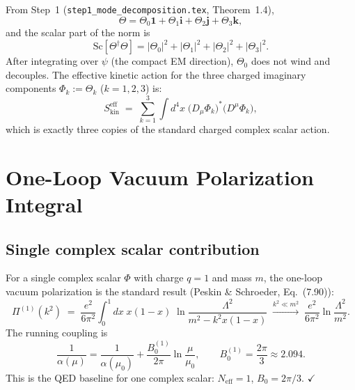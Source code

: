 \documentclass[12pt,a4paper]{article}
\theoremstyle{definition}
\theoremstyle{remark}
\newcommand{\Neff}{N_{\mathrm{eff}}}
\newcommand{\Sc}{\mathrm{Sc}}
\begin{document}
From Step~1 (\texttt{step1\_mode\_decomposition.tex}, Theorem~1.4),
\begin{equation}
  \Theta = \Theta_0 \mathbf{1} + \Theta_1 \mathbf{i} + \Theta_2 \mathbf{j} + \Theta_3 \mathbf{k},
  \label{eq:decomp}
\end{equation}
and the scalar part of the norm is
\begin{equation}
  \Sc[\Theta^\dagger \Theta] = |\Theta_0|^2 + |\Theta_1|^2 + |\Theta_2|^2 + |\Theta_3|^2.
  \label{eq:scalar_part}
\end{equation}
After integrating over $\psi$ (the compact EM direction), $\Theta_0$ does not
wind and decouples.  The effective kinetic action for the three charged
imaginary components $\Phi_k := \Theta_k$ ($k=1,2,3$) is:
\begin{equation}
  S_\mathrm{kin}^\mathrm{eff}
  \;=\; \sum_{k=1}^{3} \int d^4x\;
  \bigl(D_\mu\Phi_k\bigr)^*\bigl(D^\mu\Phi_k\bigr),
  \label{eq:S_eff}
\end{equation}
which is exactly three copies of the standard charged complex scalar action.

\section{One-Loop Vacuum Polarization Integral}
\label{sec:vac_pol}

\subsection{Single complex scalar contribution}

For a single complex scalar $\Phi$ with charge $q=1$ and mass $m$, the
one-loop vacuum polarization is the standard result (Peskin \& Schroeder,
Eq.~(7.90)):
\begin{equation}
  \Pi^{(1)}(k^2) \;=\;
  \frac{e^2}{6\pi^2}
  \int_0^1 dx\;x(1-x)\;\ln\!\frac{\Lambda^2}{m^2 - k^2 x(1-x)}
  \;\stackrel{k^2 \ll m^2}{\longrightarrow}\;
  \frac{e^2}{6\pi^2}\ln\frac{\Lambda^2}{m^2}.
  \label{eq:Pi_single}
\end{equation}
The running coupling is
\begin{equation}
  \frac{1}{\alpha(\mu)} = \frac{1}{\alpha(\mu_0)} + \frac{B_0^{(1)}}{2\pi}\ln\frac{\mu}{\mu_0},
  \qquad
  B_0^{(1)} = \frac{2\pi}{3} \approx 2.094.
  \label{eq:running_single}
\end{equation}
This is the QED baseline for one complex scalar: $\Neff = 1$, $B_0 = 2\pi/3$. $\checkmark$
\end{document}
